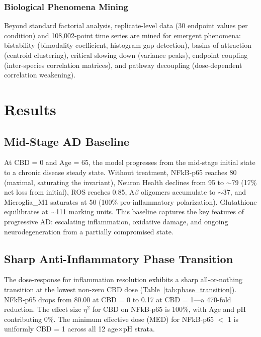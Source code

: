 \documentclass[10pt,letterpaper]{article}
\begin{document}
\subsubsection{Biological Phenomena Mining}

Beyond standard factorial analysis, replicate-level data (30 endpoint values per condition) and 108,002-point time series are mined for emergent phenomena: bistability (bimodality coefficient, histogram gap detection), basins of attraction (centroid clustering), critical slowing down (variance peaks), endpoint coupling (inter-species correlation matrices), and pathway decoupling (dose-dependent correlation weakening).

\section{Results}
\label{sec:results}

\subsection{Mid-Stage AD Baseline}

At CBD = 0 and Age = 65, the model progresses from the mid-stage initial state to a chronic disease steady state. Without treatment, NFkB-p65 reaches 80 (maximal, saturating the invariant), Neuron Health declines from 95 to $\sim$79 (17\% net loss from initial), ROS reaches 0.85, A$\beta$ oligomers accumulate to $\sim$37, and Microglia\_M1 saturates at 50 (100\% pro-inflammatory polarization). Glutathione equilibrates at $\sim$111 marking units. This baseline captures the key features of progressive AD: escalating inflammation, oxidative damage, and ongoing neurodegeneration from a partially compromised state.

\subsection{Sharp Anti-Inflammatory Phase Transition}

The dose-response for inflammation resolution exhibits a sharp all-or-nothing transition at the lowest non-zero CBD dose (Table~\ref{tab:phase_transition}). NFkB-p65 drops from 80.00 at CBD = 0 to 0.17 at CBD = 1---a 470-fold reduction. The effect size $\eta^2$ for CBD on NFkB-p65 is 100\%, with Age and pH contributing 0\%. The minimum effective dose (MED) for NFkB-p65 $<$ 1 is uniformly CBD = 1 across all 12 age$\times$pH strata.
\end{document}
